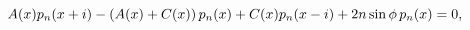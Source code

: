 \[A(x)p_{n}(x+i)-\left(A(x)+C(x)\right)p_{n}(x)+C(x)p_{n}(x-i)+2n\mathop{\sin\/}%
\nolimits\phi\,p_{n}(x)=0,\]
